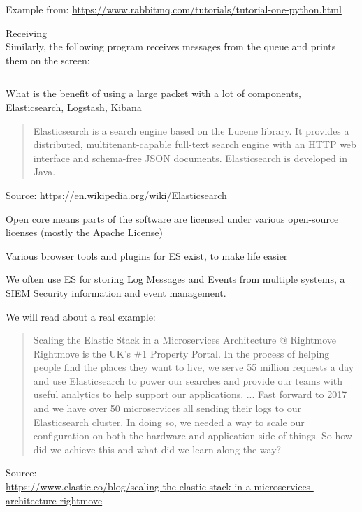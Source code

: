 \documentclass[Screen16to9,17pt]{foils}
\begin{document}
\inputminted[fontsize=\footnotesize]{python}{programs/sender.py}

Example from: \url{https://www.rabbitmq.com/tutorials/tutorial-one-python.html}


Receiving\\
Similarly, the following program receives messages from the queue and prints them on the screen:

\inputminted[fontsize=\footnotesize]{python}{programs/recv.py}




What is the benefit of using a large packet with a lot of components, Elasticsearch, Logstash, Kibana



\begin{quote}
Elasticsearch is a search engine based on the Lucene library. It provides a distributed, multitenant-capable full-text search engine with an HTTP web interface and schema-free JSON documents. Elasticsearch is developed in Java.
\end{quote}

Source: \url{https://en.wikipedia.org/wiki/Elasticsearch}

\begin{list2}
\item Open core means parts of the software are licensed under various open-source licenses (mostly the Apache License)
\item Various browser tools and plugins for ES exist, to make life easier
\item We often use ES for storing Log Messages and Events from multiple systems, a SIEM Security information and event management.
\end{list2}




We will read about a real example:

\begin{quote}
Scaling the Elastic Stack in a Microservices Architecture @ Rightmove\\
Rightmove is the UK's \#1 Property Portal. In the process of helping people find the places they want to live, we serve 55 million requests a day and use Elasticsearch to power our searches and provide our teams with useful analytics to help support our applications.
...
Fast forward to 2017 and we have over 50 microservices all sending their logs to our Elasticsearch cluster. In doing so, we needed a way to scale our configuration on both the hardware and application side of things. So how did we achieve this and what did we learn along the way?
\end{quote}
Source:\\
{\footnotesize\url{https://www.elastic.co/blog/scaling-the-elastic-stack-in-a-microservices-architecture-rightmove}}
\end{document}
